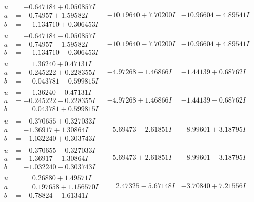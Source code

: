\documentclass[1p]{elsarticle_modified}
\theoremstyle{definition}
\begin{document}
$$\begin{array}{c|c|c}
\begin{aligned}
u &= -0.647184 + 0.050857 I \\
a &= -0.74957 + 1.59582 I \\
b &= \phantom{-}1.134710 + 0.306453 I\end{aligned}
 & -10.19640 + 7.70200 I & -10.96604 - 4.89541 I \\ \hline\begin{aligned}
u &= -0.647184 - 0.050857 I \\
a &= -0.74957 - 1.59582 I \\
b &= \phantom{-}1.134710 - 0.306453 I\end{aligned}
 & -10.19640 - 7.70200 I & -10.96604 + 4.89541 I \\ \hline\begin{aligned}
u &= \phantom{-}1.36240 + 0.47131 I \\
a &= -0.245222 + 0.228355 I \\
b &= \phantom{-}0.043781 - 0.599815 I\end{aligned}
 & -4.97268 - 1.46866 I & -1.44139 + 0.68762 I \\ \hline\begin{aligned}
u &= \phantom{-}1.36240 - 0.47131 I \\
a &= -0.245222 - 0.228355 I \\
b &= \phantom{-}0.043781 + 0.599815 I\end{aligned}
 & -4.97268 + 1.46866 I & -1.44139 - 0.68762 I \\ \hline\begin{aligned}
u &= -0.370655 + 0.327033 I \\
a &= -1.36917 + 1.30864 I \\
b &= -1.032240 + 0.303743 I\end{aligned}
 & -5.69473 - 2.61851 I & -8.99601 + 3.18795 I \\ \hline\begin{aligned}
u &= -0.370655 - 0.327033 I \\
a &= -1.36917 - 1.30864 I \\
b &= -1.032240 - 0.303743 I\end{aligned}
 & -5.69473 + 2.61851 I & -8.99601 - 3.18795 I \\ \hline\begin{aligned}
u &= \phantom{-}0.26880 + 1.49571 I \\
a &= \phantom{-}0.197658 + 1.156570 I \\
b &= -0.78824 - 1.61341 I\end{aligned}
 & \phantom{-}2.47325 - 5.67148 I & -3.70840 + 7.21556 I \\ \hline\begin{aligned}

\end{aligned}
\end{array}$$
\end{document}
